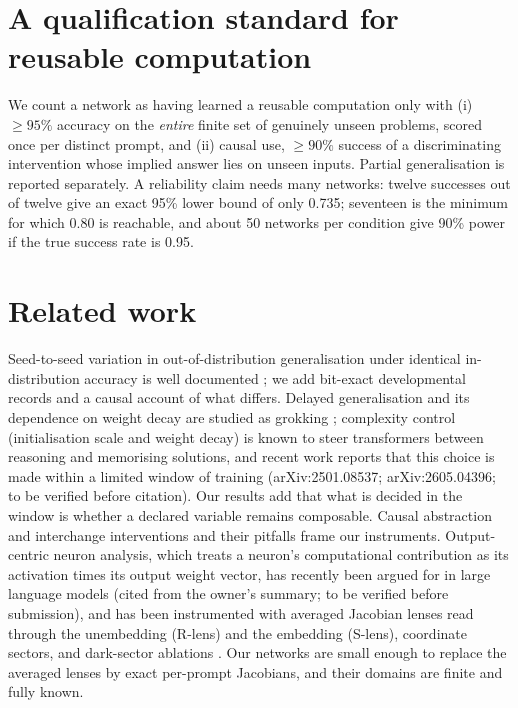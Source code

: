 \documentclass[11pt]{article}
\begin{document}
\section{A qualification standard for reusable computation}
We count a network as having learned a reusable computation only with (i) $\ge 95\%$ accuracy on the \emph{entire}
finite set of genuinely unseen problems, scored once per distinct prompt, and (ii) causal use, $\ge 90\%$ success of a
discriminating intervention whose implied answer lies on unseen inputs. Partial generalisation is reported
separately. A reliability claim needs many networks: twelve successes out of twelve give an exact 95\% lower bound of
only 0.735; seventeen is the minimum for which 0.80 is reachable, and about 50 networks per condition give 90\% power
if the true success rate is 0.95.

\section{Related work}
Seed-to-seed variation in out-of-distribution generalisation under identical in-distribution accuracy is well
documented \citep{mccoy2020berts,mccoy2020trees}; we add bit-exact developmental records and a causal account of what
differs. Delayed generalisation and its dependence on weight decay are studied as grokking
\citep{power2022grokking,nanda2023progress,liu2023omnigrok,varma2023efficiency}; complexity control (initialisation
scale and weight decay) is known to steer transformers between reasoning and memorising solutions, and recent work
reports that this choice is made within a limited window of training (arXiv:2501.08537; arXiv:2605.04396; to be
verified before citation). Our results add that what is decided in the window is whether a declared variable remains
composable. Causal abstraction and interchange interventions \citep{geiger2021causal,geiger2022iit,geiger2024causal}
and their pitfalls \citep{makelov2023illusion,wu2024reply,sutter2025nonlinear,zhang2024best,heimersheim2024patching}
frame our instruments. Output-centric neuron analysis, which treats a neuron's computational contribution as its activation
times its output weight vector, has recently been argued for in large language models
\citep{anthropic2026neuronbasis,anthropic2026neuronsafety} (cited from the owner's summary; to be verified before
submission), and has been instrumented with averaged Jacobian lenses read through the unembedding (R-lens) and the
embedding (S-lens), coordinate sectors, and dark-sector ablations \citep{neuronlens2026}. Our networks are small
enough to replace the averaged lenses by exact per-prompt Jacobians, and their domains are finite and fully known.
\end{document}
